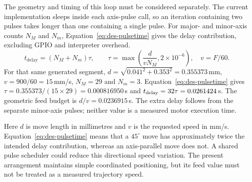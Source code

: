 \begin{designalgorithm}
\caption{Coordinated axis stepping with interruption checks}
\label{alg:des-stepping}
\begin{designpseudo}
\end{designpseudo}
\end{designalgorithm}

The geometry and timing of this loop must be considered separately. The current implementation sleeps inside each axis-pulse call, so an iteration containing two pulses takes longer than one containing a single pulse. For major- and minor-axis counts $N_M$ and $N_m$, Equation~\ref{eq:des-pulsetime} gives the delay contribution, excluding GPIO and interpreter overhead.
\begin{equation}
t_{\mathrm{delay}}=(N_M+N_m)\tau,\qquad
\tau=\max\left(\frac{d}{vN_M},2\times10^{-6}\right),\quad v=F/60.
\label{eq:des-pulsetime}
\end{equation}
For that same generated segment, $d=\sqrt{0.041^2+0.353^2}=0.355373$\,mm, $v=900/60=15$\,mm/s, $N_M=29$ and $N_m=3$. Equation~\ref{eq:des-pulsetime} gives $\tau=0.355373/(15\times29)=0.000816950$\,s and $t_{\rm delay}=32\tau=0.0261424$\,s. The geometric feed budget is $d/v=0.0236915$\,s. The extra delay follows from the separate minor-axis pulses; neither value is a measured motor execution time.

Here $d$ is move length in millimetres and $v$ is the requested speed in mm/s. Equation~\ref{eq:des-pulsetime} means that a $45^\circ$ move has approximately twice the intended delay contribution, whereas an axis-parallel move does not. A shared pulse scheduler could reduce this directional speed variation. The present arrangement maintains simple coordinated positioning, but its feed value must not be treated as a measured trajectory speed.

